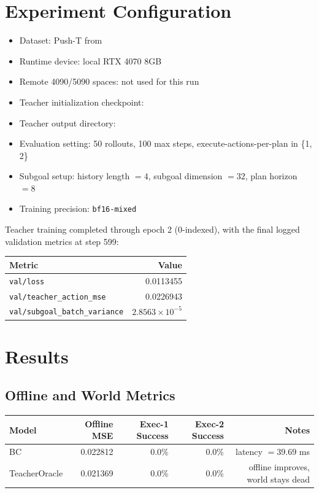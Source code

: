 \documentclass[11pt]{article}
\begin{document}
\section*{Experiment Configuration}
\begin{itemize}
\item Dataset: Push-T from 
\item Runtime device: local RTX 4070 8GB
\item Remote 4090/5090 spaces: not used for this run
\item Teacher initialization checkpoint:
\item Teacher output directory:
\item Evaluation setting: 50 rollouts, 100 max steps, execute-actions-per-plan in \{1, 2\}
\item Subgoal setup: history length \(=4\), subgoal dimension \(=32\), plan horizon \(=8\)
\item Training precision: \texttt{bf16-mixed}
\end{itemize}

Teacher training completed through epoch 2 (0-indexed), with the final logged validation metrics at step 599:
\begin{center}
\begin{tabular}{lr}
\toprule
\textbf{Metric} & \textbf{Value} \\
\midrule
\texttt{val/loss} & 0.0113455 \\
\texttt{val/teacher\_action\_mse} & 0.0226943 \\
\texttt{val/subgoal\_batch\_variance} & \(2.8563\times10^{-5}\) \\
\bottomrule
\end{tabular}
\end{center}

\section*{Results}

\subsection*{Offline and World Metrics}
\begin{center}
\begin{tabular}{lrrrr}
\toprule
\textbf{Model} & \textbf{Offline MSE} & \textbf{Exec-1 Success} & \textbf{Exec-2 Success} & \textbf{Notes} \\
\midrule
BC & 0.022812 & 0.0\% & 0.0\% & latency \(=39.69\) ms \\
TeacherOracle & 0.021369 & 0.0\% & 0.0\% & offline improves, world stays dead \\
\bottomrule
\end{tabular}
\end{center}
\end{document}
